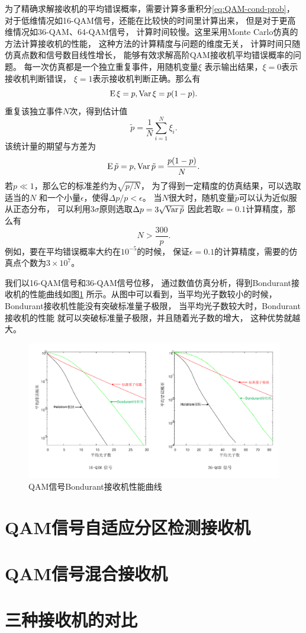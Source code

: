 为了精确求解接收机的平均错误概率，需要计算多重积分\ref{eq:QAM-cond-prob}，
对于低维情况如16-QAM信号，还能在比较快的时间里计算出来，
但是对于更高维情况如36-QAM、64-QAM信号，
计算时间较慢。这里采用Monte Carlo仿真的方法计算接收机的性能，
这种方法的计算精度与问题的维度无关\cite{mcbook}，
计算时间只随仿真点数和信号数目线性增长，
能够有效求解高阶QAM接收机平均错误概率的问题。
每一次仿真都是一个独立重复事件，用随机变量$\xi$
表示输出结果，$\xi=0$表示接收机判断错误，
$\xi=1$表示接收机判断正确。那么有
\begin{equation}
\operatorname{E} \xi = p, \operatorname{Var} \xi = p(1-p).
\end{equation}
重复该独立事件$N$次，得到估计值
\begin{equation}
\tilde{p} = \frac{1}{N} \sum_{i=1}^N \xi_i.
\end{equation}
该统计量的期望与方差为
\begin{equation}
\operatorname{E} \tilde{p} = p, \operatorname{Var} \tilde{p} = \frac{p(1-p)}{N}.
\end{equation}
若$p \ll 1$，那么它的标准差约为$\sqrt{p/N}$，
为了得到一定精度的仿真结果，可以选取适当的$N$
和一个小量$\epsilon$，使得$\Delta p / p < \epsilon$。
当$N$很大时，随机变量$\tilde{p}$可以认为近似服从正态分布，
可以利用$3\sigma$原则选取$\Delta p = 3 \sqrt{\operatorname{Var} \tilde{p}}$
因此若取$\epsilon=0.1$计算精度，那么有
\begin{equation}
N > \frac{300}{p}.
\end{equation}
例如，要在平均错误概率大约在$10^{-5}$的时候，
保证$\epsilon=0.1$的计算精度，需要的仿真点个数为$3\times10^7$。

我们以16-QAM信号和36-QAM信号位移，
通过数值仿真分析，得到Bondurant接收机的性能曲线如图\ref{fig:QAM-bondurant-error}
所示。从图中可以看到，当平均光子数较小的时候，
Bondurant接收机性能没有突破标准量子极限，
当平均光子数较大时，Bondurant接收机的性能
就可以突破标准量子极限，并且随着光子数的增大，
这种优势就越大。

\begin{figure}
\centering
  \includegraphics[width=\textwidth]{figures/chap3/QAM-bondurant-error}
  \caption{QAM信号Bondurant接收机性能曲线}
  \label{fig:QAM-bondurant-error}
\end{figure}


\section{QAM信号自适应分区检测接收机}


\section{QAM信号混合接收机}


\section{三种接收机的对比}

